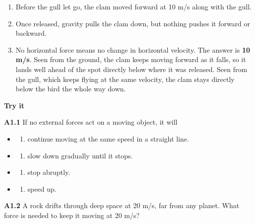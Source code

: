 \documentclass[
]{article}
\providecommand{\tightlist}{%
  \setlength{\itemsep}{0pt}\setlength{\parskip}{0pt}}
\begin{document}
\begin{enumerate}
\def\labelenumi{\arabic{enumi}.}
\tightlist
\item
  Before the gull let go, the clam moved forward at 10 m/s along with
  the gull.
\item
  Once released, gravity pulls the clam down, but nothing pushes it
  forward or backward.
\item
  No horizontal force means no change in horizontal velocity. The answer
  is \textbf{10 m/s}. Seen from the ground, the clam keeps moving
  forward as it falls, so it lands well ahead of the spot directly below
  where it was released. Seen from the gull, which keeps flying at the
  same velocity, the clam stays directly below the bird the whole way
  down.
\end{enumerate}

\textbf{Try it}

\textbf{A1.1} If no external forces act on a moving object, it will

\begin{itemize}
\tightlist
\item
  \begin{enumerate}
  \def\labelenumi{\Alph{enumi})}
  \tightlist
  \item
    continue moving at the same speed in a straight line.
  \end{enumerate}
\item
  \begin{enumerate}
  \def\labelenumi{\Alph{enumi})}
  \setcounter{enumi}{1}
  \tightlist
  \item
    slow down gradually until it stops.
  \end{enumerate}
\item
  \begin{enumerate}
  \def\labelenumi{\Alph{enumi})}
  \setcounter{enumi}{2}
  \tightlist
  \item
    stop abruptly.
  \end{enumerate}
\item
  \begin{enumerate}
  \def\labelenumi{\Alph{enumi})}
  \setcounter{enumi}{3}
  \tightlist
  \item
    speed up.
  \end{enumerate}
\end{itemize}

\textbf{A1.2} A rock drifts through deep space at 20 m/s, far from any
planet. What force is needed to keep it moving at 20 m/s?
\end{document}
